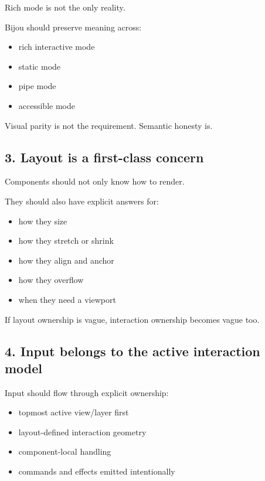 Rich mode is not the only reality.

Bijou should preserve meaning across:

\begin{itemize}
\tightlist
\item
  rich interactive mode
\item
  static mode
\item
  pipe mode
\item
  accessible mode
\end{itemize}

Visual parity is not the requirement. Semantic honesty is.

\subsection{3. Layout is a first-class concern}\label{record-035-layout-is-a-first-class-concern}

Components should not only know how to render.

They should also have explicit answers for:

\begin{itemize}
\tightlist
\item
  how they size
\item
  how they stretch or shrink
\item
  how they align and anchor
\item
  how they overflow
\item
  when they need a viewport
\end{itemize}

If layout ownership is vague, interaction ownership becomes vague too.

\subsection{4. Input belongs to the active interaction model}\label{record-035-input-belongs-to-the-active-interaction-model}

Input should flow through explicit ownership:

\begin{itemize}
\tightlist
\item
  topmost active view/layer first
\item
  layout-defined interaction geometry
\item
  component-local handling
\item
  commands and effects emitted intentionally
\end{itemize}


